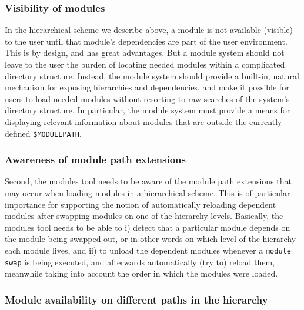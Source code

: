 \subsubsection{Visibility of modules}
\label{sec:hierarchical_consequences_visibility}

In the hierarchical scheme we describe above, a module is not available (visible)
to the user until that module's dependencies are part of the user environment.  This
is by design, and has great advantages. But a module system should not leave to the
user the burden of locating needed modules within a complicated directory structure. 
Instead, the module system should provide a built-in, natural mechanism for exposing 
hierarchies and dependencies, and make it possible for users to load needed modules
without resorting to raw searches of the system's directory structure. In particular,
the module system must provide a means for displaying relevant information about
modules that are outside the currently defined \texttt{\small \$MODULEPATH}.


\subsubsection{Awareness of module path extensions}
\label{sec:hierarchical_consequences_extensions}

Second, the modules tool needs to be aware of the module path extensions that
may occur when loading modules in a hierarchical scheme. This is of
particular importance for supporting the notion of automatically reloading
dependent modules after swapping modules on one of the hierarchy levels.
Basically, the modules tool needs to be able to i) detect that a particular
module depends on the module being swapped out, or in other words on which
level of the hierarchy each module lives, and ii) to unload the dependent
modules whenever a \texttt{\small module swap} is being executed, and afterwards
automatically (try to) reload them, meanwhile taking into
account the order in which the modules were loaded.

\subsubsection{Module availability on different paths in the hierarchy}
\label{sec:hierarchical_consequences_availability}

